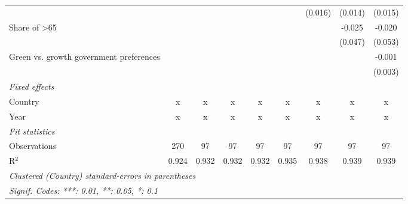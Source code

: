 \begin{table}[htbp]
\begin{tabular}{lcccccccc}
                                              &         &              &         &         &         & (0.016) & (0.014)       & (0.015)\\   
      Share of >65                            &         &              &         &         &         &         & -0.025        & -0.020\\   
                                              &         &              &         &         &         &         & (0.047)       & (0.053)\\   
      Green vs. growth government preferences &         &              &         &         &         &         &               & -0.001\\   
                                              &         &              &         &         &         &         &               & (0.003)\\   
      \emph{Fixed effects}\\
      Country                                 & x       & x            & x       & x       & x       & x       & x             & x\\  
      Year                                    & x       & x            & x       & x       & x       & x       & x             & x\\  
      \midrule \emph{Fit statistics}\\
      Observations                            & 270     & 97           & 97      & 97      & 97      & 97      & 97            & 97\\  
      R$^2$                                   & 0.924   & 0.932        & 0.932   & 0.932   & 0.935   & 0.938   & 0.939         & 0.939\\  
      \midrule
      \multicolumn{9}{l}{\emph{Clustered (Country) standard-errors in parentheses}}\\
      \multicolumn{9}{l}{\emph{Signif. Codes: ***: 0.01, **: 0.05, *: 0.1}}\\
   \end{tabular}
\end{table}


